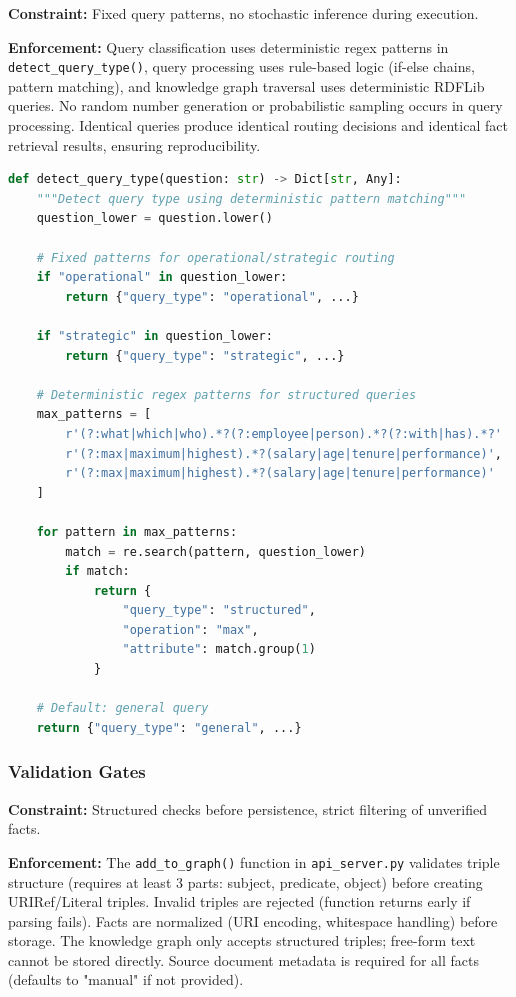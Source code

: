 \textbf{Constraint:} Fixed query patterns, no stochastic inference during execution.

\textbf{Enforcement:} Query classification uses deterministic regex patterns in \texttt{detect\_query\_type()}, query processing uses rule-based logic (if-else chains, pattern matching), and knowledge graph traversal uses deterministic RDFLib queries. No random number generation or probabilistic sampling occurs in query processing. Identical queries produce identical routing decisions and identical fact retrieval results, ensuring reproducibility.

\begin{lstlisting}[language=Python, caption=Deterministic query classification using fixed regex patterns]
def detect_query_type(question: str) -> Dict[str, Any]:
    """Detect query type using deterministic pattern matching"""
    question_lower = question.lower()
    
    # Fixed patterns for operational/strategic routing
    if "operational" in question_lower:
        return {"query_type": "operational", ...}
    
    if "strategic" in question_lower:
        return {"query_type": "strategic", ...}
    
    # Deterministic regex patterns for structured queries
    max_patterns = [
        r'(?:what|which|who).*?(?:employee|person).*?(?:with|has).*?'
        r'(?:max|maximum|highest).*?(salary|age|tenure|performance)',
        r'(?:max|maximum|highest).*?(salary|age|tenure|performance)'
    ]
    
    for pattern in max_patterns:
        match = re.search(pattern, question_lower)
        if match:
            return {
                "query_type": "structured",
                "operation": "max",
                "attribute": match.group(1)
            }
    
    # Default: general query
    return {"query_type": "general", ...}
\end{lstlisting}

\subsubsection{Validation Gates}

\textbf{Constraint:} Structured checks before persistence, strict filtering of unverified facts.

\textbf{Enforcement:} The \texttt{add\_to\_graph()} function in \texttt{api\_server.py} validates triple structure (requires at least 3 parts: subject, predicate, object) before creating URIRef/Literal triples. Invalid triples are rejected (function returns early if parsing fails). Facts are normalized (URI encoding, whitespace handling) before storage. The knowledge graph only accepts structured triples; free-form text cannot be stored directly. Source document metadata is required for all facts (defaults to "manual" if not provided).

